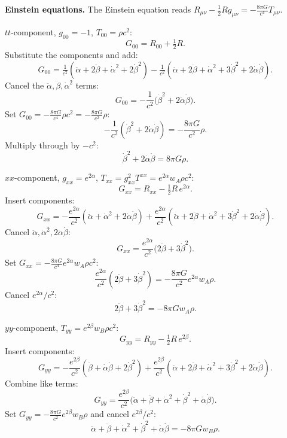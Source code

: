 \documentclass[11pt]{article}
\begin{document}
\textbf{Einstein equations.} The Einstein equation reads $R_{\mu\nu}-\tfrac12 Rg_{\mu\nu}=-\tfrac{8\pi G}{c^4}T_{\mu\nu}$.

$tt$-component, $g_{00}=-1$, $T_{00}=\rho c^2$:
\[
G_{00}=R_{00}+\tfrac12 R.
\]
Substitute the components and add:
\[
G_{00}=\tfrac{1}{c^2}(\ddot\alpha+2\ddot\beta+\dot\alpha^2+2\dot\beta^2)-\tfrac{1}{c^2}(\ddot\alpha+2\ddot\beta+\dot\alpha^2+3\dot\beta^2+2\dot\alpha\dot\beta).
\]
Cancel the $\ddot\alpha,\ddot\beta,\dot\alpha^2$ terms:
\[
G_{00}=-\frac{1}{c^2}\bigl(\dot\beta^2+2\dot\alpha\dot\beta\bigr).
\]
Set $G_{00}=-\tfrac{8\pi G}{c^4}\rho c^2=-\tfrac{8\pi G}{c^2}\rho$:
\[
-\frac{1}{c^2}(\dot\beta^2+2\dot\alpha\dot\beta)=-\frac{8\pi G}{c^2}\rho.
\]
Multiply through by $-c^2$:
\begin{equation}
\boxed{\ \dot\beta^2+2\dot\alpha\dot\beta=8\pi G\rho.\ }
\label{eq:Friedmann1}
\end{equation}

$xx$-component, $g_{xx}=e^{2\alpha}$, $T_{xx}=g_{xx}^2 T^{xx}=e^{2\alpha}w_A\rho c^2$:
\[
G_{xx}=R_{xx}-\tfrac12 R\,e^{2\alpha}.
\]
Insert components:
\[
G_{xx}=-\frac{e^{2\alpha}}{c^2}(\ddot\alpha+\dot\alpha^2+2\dot\alpha\dot\beta)+\frac{e^{2\alpha}}{c^2}(\ddot\alpha+2\ddot\beta+\dot\alpha^2+3\dot\beta^2+2\dot\alpha\dot\beta).
\]
Cancel $\ddot\alpha,\dot\alpha^2,2\dot\alpha\dot\beta$:
\[
G_{xx}=\frac{e^{2\alpha}}{c^2}\bigl(2\ddot\beta+3\dot\beta^2\bigr).
\]
Set $G_{xx}=-\tfrac{8\pi G}{c^4}e^{2\alpha}w_A\rho c^2$:
\[
\frac{e^{2\alpha}}{c^2}(2\ddot\beta+3\dot\beta^2)=-\frac{8\pi G}{c^2}e^{2\alpha}w_A\rho.
\]
Cancel $e^{2\alpha}/c^2$:
\begin{equation}
\boxed{\ 2\ddot\beta+3\dot\beta^2=-8\pi G w_A\rho.\ }
\label{eq:Friedmann2}
\end{equation}

$yy$-component, $T_{yy}=e^{2\beta}w_B\rho c^2$:
\[
G_{yy}=R_{yy}-\tfrac12 R\,e^{2\beta}.
\]
Insert components:
\[
G_{yy}=-\frac{e^{2\beta}}{c^2}(\ddot\beta+\dot\alpha\dot\beta+2\dot\beta^2)+\frac{e^{2\beta}}{c^2}(\ddot\alpha+2\ddot\beta+\dot\alpha^2+3\dot\beta^2+2\dot\alpha\dot\beta).
\]
Combine like terms:
\[
G_{yy}=\frac{e^{2\beta}}{c^2}\bigl(\ddot\alpha+\ddot\beta+\dot\alpha^2+\dot\beta^2+\dot\alpha\dot\beta\bigr).
\]
Set $G_{yy}=-\tfrac{8\pi G}{c^2}e^{2\beta}w_B\rho$ and cancel $e^{2\beta}/c^2$:
\begin{equation}
\boxed{\ \ddot\alpha+\ddot\beta+\dot\alpha^2+\dot\beta^2+\dot\alpha\dot\beta=-8\pi G w_B\rho.\ }
\label{eq:Friedmann3}
\end{equation}
\end{document}
